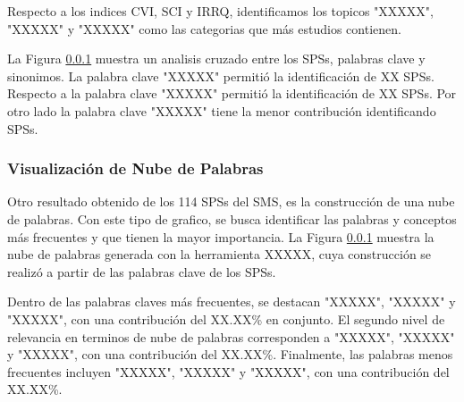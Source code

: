 Respecto a los indices CVI, SCI y IRRQ, identificamos los topicos "XXXXX", "XXXXX" y "XXXXX" como las categorias que más estudios contienen.

La Figura \ref{} muestra un analisis cruzado entre los SPSs, palabras clave y sinonimos. La palabra clave "XXXXX" permitió la identificación de XX SPSs. Respecto a la palabra clave "XXXXX" permitió la identificación de XX SPSs. Por otro lado la palabra clave "XXXXX" tiene la menor contribución identificando SPSs.

\subsubsection{Visualización de Nube de Palabras}
Otro resultado obtenido de los 114 SPSs del SMS, es la construcción de una nube de palabras. Con este tipo de grafico, se busca identificar las palabras y conceptos más frecuentes y que tienen la mayor importancia. La Figura \ref{} muestra la nube de palabras generada con la herramienta XXXXX, cuya construcción se realizó a partir de las palabras clave de los SPSs.

Dentro de las palabras claves más frecuentes, se destacan "XXXXX", "XXXXX" y "XXXXX", con una contribución del XX.XX\% en conjunto. El segundo nivel de relevancia en terminos de nube de palabras corresponden a "XXXXX", "XXXXX" y "XXXXX", con una contribución del XX.XX\%. Finalmente, las palabras menos frecuentes incluyen "XXXXX", "XXXXX" y "XXXXX", con una contribución del XX.XX\%.
